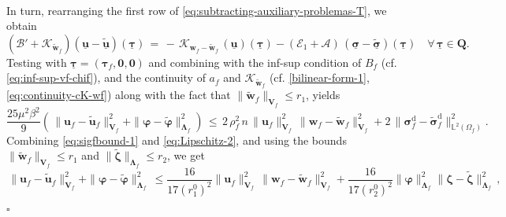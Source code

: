 \documentclass[11pt]{article}
\numberwithin{equation}{section}
\newcommand{\ds}{\displaystyle}
\newcommand{\bLambda}{{\boldsymbol\Lambda}}
\newcommand{\bsi}{{\boldsymbol\sigma}}
\newcommand{\bvarphi}{{\boldsymbol\varphi}}
\newcommand{\btau}{{\boldsymbol\tau}}
\newcommand{\bzeta}{{\boldsymbol\zeta}}
\newcommand{\ubsi}{\underline{\bsi}}
\newcommand{\ubtau}{\underline{\btau}}
\newcommand{\ubu}{\underline{\bu}}
\newcommand{\bw}{{\mathbf{w}}}
\newcommand{\bu}{\mathbf{u}}
\newcommand{\0}{{\mathbf{0}}}
\def\bV{\mathbf{V}}
\def\bQ{\mathbf{Q}}
\newcommand\bbL{\mathbb{L}}
\newcommand{\cA}{\mathcal{A}}
\newcommand{\cB}{\mathcal{B}}
\newcommand{\cE}{\mathcal{E}}
\newcommand{\cK}{\mathcal{K}}
\def\rd{\mathrm{d}}
\def\wt{\widetilde}
\newenvironment{proof}{\noindent{\it Proof.}}{\hfill$\square$}
\numberwithin{equation}{section}
\begin{document}
\begin{proof}
\begin{align}
\end{align}
In turn, rearranging the first row of \eqref{eq:subtracting-auxiliary-problemas-T}, we obtain
\begin{equation*}
\ds (\cB' + \cK_{\wt{\bw}_f})(\ubu - \wt{\ubu})(\ubtau) 
\,=\, -\,\cK_{\bw_f - \wt{\bw}_f}\,(\ubu)(\ubtau) - (\cE_1 + \cA)\,(\ubsi - \wt{\ubsi})(\ubtau) \quad \forall\,\ubtau\in \bQ.
\end{equation*}
Testing with $\ubtau=(\btau_f, \0, \0)$ and combining with the inf-sup condition of $B_f$ (cf. \eqref{eq:inf-sup-vf-chif}), and the continuity of $a_f$ and $\cK_{\wt{\bw}_f}$ (cf. \eqref{bilinear-form-1}, \eqref{eq:continuity-cK-wf}) along with the fact that $\|\wt{\bw}_f\|_{\bV_f} \leq r_1$, yields
\begin{equation}\label{eq:Lipschitz-2}
\frac{25 \mu^2 \beta^2}{9}(\,\|\bu_f - \wt{\bu}_f\|^2_{\bV_f} +\|\bvarphi-\wt{\bvarphi}\|^2_{\bLambda_f})
\,\leq\, 2\,\rho_f^2\,n\,\|\bu_f\|^2_{\bV_f}\,\|\bw_f - \wt{\bw}_f\|^2_{\bV_f} + 2\,\|\bsi^\rd_f - \wt{\bsi}^\rd_f\|^2_{\bbL^2(\Omega_f)}.
\end{equation}
Combining \eqref{eq:sigfbound-1} and \eqref{eq:Lipschitz-2}, and using the bounds $\|\wt{\bw}_f\|_{\bV_f} \leq r_1$ and $\|\wt{\bzeta}\|_{\bLambda_f}\leq r_2$, we get
\begin{equation*}%
\,\|\bu_f - \wt{\bu}_f\|^2_{\bV_f} +\|\bvarphi-\wt{\bvarphi}\|^2_{\bLambda_f}
\,\leq \frac{16}{17(r_1^0)^2}\|\bu_f\|^2_{\bV_f}\,\|\bw_f - \wt{\bw}_f\|^2_{\bV_f} + \frac{16}{17(r_2^0)^2}\|\bvarphi\|^2_{\bLambda_f}\|\bzeta-\wt{\bzeta}\|^2_{\bLambda_f}\,,
\end{equation*}

\end{proof}
\end{document}
